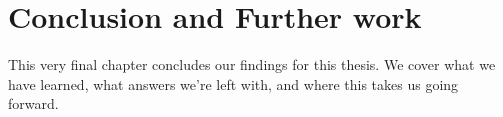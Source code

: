 \chapter{Conclusion and Further work}
\label{chap:conclusion}

This very final chapter concludes our findings for this thesis. We cover what we have learned, what answers we're left with, and where this takes us going forward.




